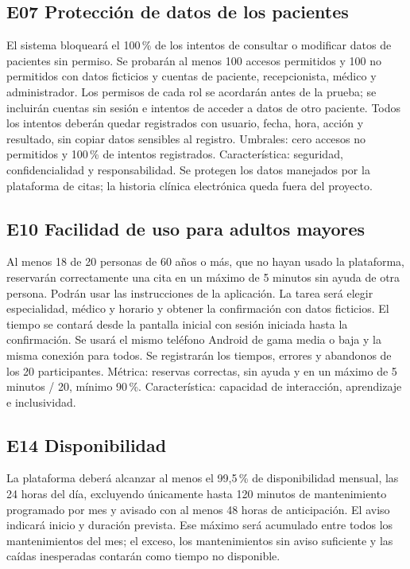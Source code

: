 \documentclass[11pt,a4paper]{article}
\begin{document}
\subsection{E07 Protección de datos de los pacientes}
El sistema bloqueará el 100\,\% de los intentos de consultar o modificar datos de pacientes sin permiso. Se probarán al menos 100 accesos permitidos y 100 no permitidos con datos ficticios y cuentas de paciente, recepcionista, médico y administrador. Los permisos de cada rol se acordarán antes de la prueba; se incluirán cuentas sin sesión e intentos de acceder a datos de otro paciente. Todos los intentos deberán quedar registrados con usuario, fecha, hora, acción y resultado, sin copiar datos sensibles al registro. Umbrales: cero accesos no permitidos y 100\,\% de intentos registrados. Característica: seguridad, confidencialidad y responsabilidad. Se protegen los datos manejados por la plataforma de citas; la historia clínica electrónica queda fuera del proyecto.

\subsection{E10 Facilidad de uso para adultos mayores}
Al menos 18 de 20 personas de 60 años o más, que no hayan usado la plataforma, reservarán correctamente una cita en un máximo de 5 minutos sin ayuda de otra persona. Podrán usar las instrucciones de la aplicación. La tarea será elegir especialidad, médico y horario y obtener la confirmación con datos ficticios. El tiempo se contará desde la pantalla inicial con sesión iniciada hasta la confirmación. Se usará el mismo teléfono Android de gama media o baja y la misma conexión para todos. Se registrarán los tiempos, errores y abandonos de los 20 participantes. Métrica: reservas correctas, sin ayuda y en un máximo de 5 minutos / 20, mínimo 90\,\%. Característica: capacidad de interacción, aprendizaje e inclusividad.

\subsection{E14 Disponibilidad}
La plataforma deberá alcanzar al menos el 99,5\,\% de disponibilidad mensual, las 24 horas del día, excluyendo únicamente hasta 120 minutos de mantenimiento programado por mes y avisado con al menos 48 horas de anticipación. El aviso indicará inicio y duración prevista. Ese máximo será acumulado entre todos los mantenimientos del mes; el exceso, los mantenimientos sin aviso suficiente y las caídas inesperadas contarán como tiempo no disponible.
\end{document}
